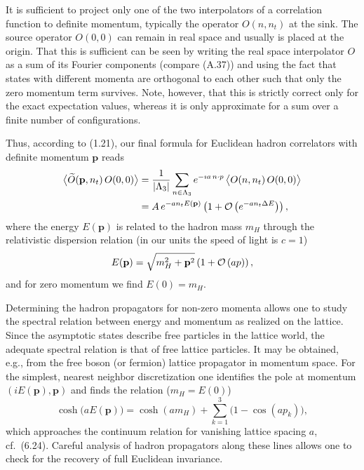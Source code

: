 It is sufficient to project only one of the two interpolators of a correlation
function to definite momentum, typically the operator $O(n, n_t)$ at the sink.
The source operator $O(0, 0)$ can remain in real space and usually is placed at
the origin. That this is sufficient can be seen by writing the real space
interpolator $O$ as a sum of its Fourier components (compare (A.37)) and using
the fact that states with different momenta are orthogonal to each other such
that only the zero momentum term survives. Note, however, that this is strictly
correct only for the exact expectation values, whereas it is only approximate
for a sum over a finite number of configurations.

Thus, according to (1.21), our final formula for Euclidean hadron correlators
with definite momentum $\mathbf{p}$ reads
\begin{equation}
  \begin{split}
    \big\langle \widetilde{O}(\mathbf{p}, n_t)\, O(0, 0) \big\rangle
    &= \frac{1}{|\Lambda_3|}\sum_{n\in\Lambda_3} e^{-\imath a\, n\cdot p}\,
       \big\langle O(n, n_t)\, O(0, 0) \big\rangle \\
    &= A\, e^{-a n_t E(\mathbf{p})}\left( 1 + \mathcal{O}\left(e^{-a n_t \Delta E}\right)
       \right),
  \end{split}
\end{equation}
where the energy $E(\mathbf{p})$ is related to the hadron mass $m_H$ through
the relativistic dispersion relation (in our units the speed of light is
$c = 1$)
\begin{equation}
  E(\mathbf{p}) = \sqrt{m_H^2 + \mathbf{p}^2}\left( 1 + \mathcal{O}\left(ap\right) \right),
\end{equation}
and for zero momentum we find $E(0) = m_H$.

Determining the hadron propagators for non-zero momenta allows one to study the
spectral relation between energy and momentum as realized on the lattice. Since
the asymptotic states describe free particles in the lattice world, the
adequate spectral relation is that of free lattice particles. It may be
obtained, e.g., from the free boson (or fermion) lattice propagator in momentum
space. For the simplest, nearest neighbor discretization one identifies the
pole at momentum $(iE(\mathbf{p}), \mathbf{p})$ and finds the relation
($m_H = E(0)$)
\begin{equation}
  \cosh\bigl(a E(\mathbf{p})\bigr) = \cosh(a m_H)
    + \sum_{k=1}^{3} \bigl( 1 - \cos(a p_k) \bigr) ,
\end{equation}
which approaches the continuum relation for vanishing lattice spacing $a$, cf.\
(6.24). Careful analysis of hadron propagators along these lines allows one to
check for the recovery of full Euclidean invariance.

